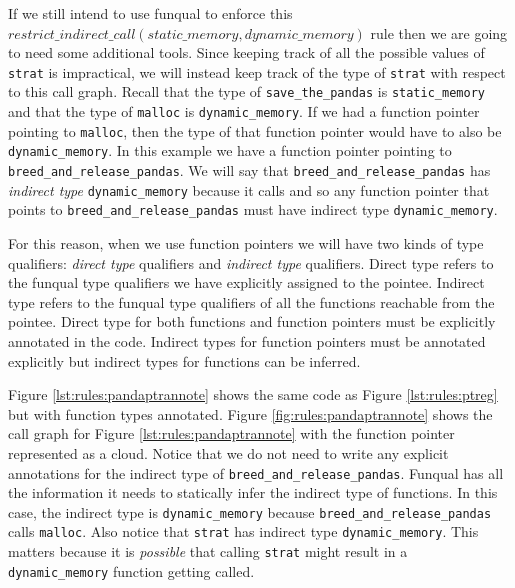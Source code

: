 \begin{sloppypar}
If we still intend to use funqual to enforce this $restrict\_indirect\_call(\allowbreak static\_memory, dynamic\_memory)$ rule then we are going to need some additional tools.  Since keeping track of all the possible values of \lstinline{strat} is impractical, we will instead keep track of the type of \lstinline{strat} with respect to this call graph.  Recall that the type of \lstinline{save_the_pandas} is \lstinline{static_memory} and that the type of \lstinline{malloc} is \lstinline{dynamic_memory}.  If we had a function pointer pointing to \lstinline{malloc}, then the type of that function pointer would have to also be \lstinline{dynamic_memory}.  In this example we have a function pointer pointing to \lstinline{breed_and_release_pandas}.  We will say that \lstinline{breed_and_release_pandas} has \textit{indirect type} \lstinline{dynamic_memory} because it calls  and so any function pointer that points to \lstinline{breed_and_release_pandas} must have indirect type \lstinline{dynamic_memory}.
\end{sloppypar}

For this reason, when we use function pointers we will have two kinds of type qualifiers:  \textit{direct type} qualifiers and \textit{indirect type} qualifiers.  Direct type refers to the funqual type qualifiers we have explicitly assigned to the pointee.  Indirect type refers to the funqual type qualifiers of all the functions reachable from the pointee.  Direct type for both functions and function pointers must be explicitly annotated in the code.  Indirect types for function pointers must be annotated explicitly but indirect types for functions can be inferred. 

Figure \ref{lst:rules:pandaptrannote} shows the same code as Figure \ref{lst:rules:ptreg} but with function types annotated.  Figure \ref{fig:rules:pandaptrannote} shows the call graph for Figure \ref{lst:rules:pandaptrannote} with the function pointer represented as a cloud.  Notice that we do not need to write any explicit annotations for the indirect type of \lstinline{breed_and_release_pandas}.  Funqual has all the information it needs to statically infer the indirect type of functions.  In this case, the indirect type is \lstinline{dynamic_memory} because \lstinline{breed_and_release_pandas} calls \lstinline{malloc}.  Also notice that \lstinline{strat} has indirect type \lstinline{dynamic_memory}.  This matters because it is \textit{possible} that calling \lstinline{strat} might result in a \lstinline{dynamic_memory} function getting called.  

